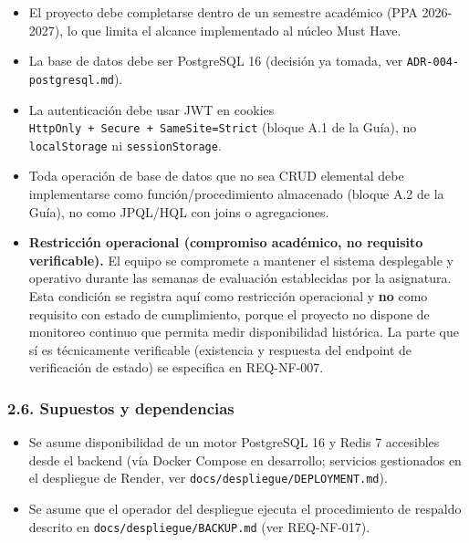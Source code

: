 \documentclass[
  spanish,
]{article}
\providecommand{\tightlist}{%
  \setlength{\itemsep}{0pt}\setlength{\parskip}{0pt}}
\begin{document}
\begin{itemize}
\tightlist
\item
  El proyecto debe completarse dentro de un semestre académico (PPA
  2026-2027), lo que limita el alcance implementado al núcleo Must Have.
\item
  La base de datos debe ser PostgreSQL 16 (decisión ya tomada, ver
  \texttt{ADR-\allowbreak{}004-\allowbreak{}postgresql.\allowbreak{}md}).
\item
  La autenticación debe usar JWT en cookies
  \texttt{Http\allowbreak{}Only\ +\ Secure\ +\ Same\allowbreak{}Site=Strict} (bloque A.1 de la
  Guía), no \texttt{local\allowbreak{}Storage} ni \texttt{session\allowbreak{}Storage}.
\item
  Toda operación de base de datos que no sea CRUD elemental debe
  implementarse como función/procedimiento almacenado (bloque A.2 de la
  Guía), no como JPQL/HQL con joins o agregaciones.
\item
  \textbf{Restricción operacional (compromiso académico, no requisito
  verificable).} El equipo se compromete a mantener el sistema
  desplegable y operativo durante las semanas de evaluación establecidas
  por la asignatura. Esta condición se registra aquí como restricción
  operacional y \textbf{no} como requisito con estado de cumplimiento,
  porque el proyecto no dispone de monitoreo continuo que permita medir
  disponibilidad histórica. La parte que sí es técnicamente verificable
  (existencia y respuesta del endpoint de verificación de estado) se
  especifica en REQ-NF-007.
\end{itemize}

\subsubsection{2.6. Supuestos y
dependencias}\label{supuestos-y-dependencias}

\begin{itemize}
\tightlist
\item
  Se asume disponibilidad de un motor PostgreSQL 16 y Redis 7 accesibles
  desde el backend (vía Docker Compose en desarrollo; servicios
  gestionados en el despliegue de Render, ver
  \texttt{docs/\allowbreak{}despliegue/\allowbreak{}DEPLOYMENT.\allowbreak{}md}).
\item
  Se asume que el operador del despliegue ejecuta el procedimiento de
  respaldo descrito en \texttt{docs/\allowbreak{}despliegue/\allowbreak{}BACKUP.\allowbreak{}md} (ver
  REQ-NF-017).
\end{itemize}
\end{document}
